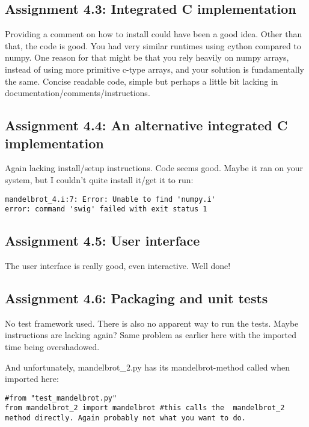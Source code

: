 \documentclass[a4paper]{article}
\begin{document}
\subsection*{Assignment 4.3: Integrated C implementation}
Providing a comment on how to install could have been a good idea.
Other than that, the code is good. You had very similar runtimes using cython compared to numpy. One reason for that might be that you rely heavily on numpy arrays, instead of using more primitive c-type arrays, and your solution is fundamentally the same. Concise readable code, simple but perhaps a little bit lacking in documentation/comments/instructions.


\subsection*{Assignment 4.4:  An alternative integrated C implementation}
Again lacking install/setup instructions.
Code seems good. Maybe it ran on your system, but I couldn't quite install it/get it to run:

\begin{verbatim}
mandelbrot_4.i:7: Error: Unable to find 'numpy.i'
error: command 'swig' failed with exit status 1
\end{verbatim}

\subsection*{Assignment 4.5: User interface}
The user interface is really good, even interactive. Well done!

\subsection*{Assignment 4.6:  Packaging and unit tests}
No test framework used. There is also no apparent way to run the tests.
Maybe instructions are lacking again?
Same problem as earlier here with the imported time being overshadowed.

And unfortunately, mandelbrot\_2.py has its mandelbrot-method called when imported here:

\begin{verbatim}
#from "test_mandelbrot.py"
from mandelbrot_2 import mandelbrot #this calls the  mandelbrot_2 method directly. Again probably not what you want to do.
\end{verbatim}
\end{document}
